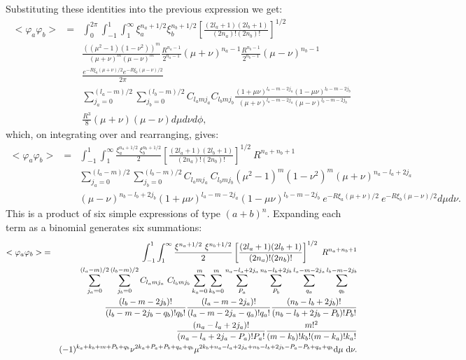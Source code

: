 Substituting these identities into the previous
expression we get:
\begin{eqnarray}
<\varphi _a\varphi _b>& =& \int _0^{2\pi }\int _{-1}^{1} \int _1^{\infty}
\xi_a ^{n_a+1/2}\xi_b^{n_b+1/2}\left [\frac{(2l_a+1)(2l_b+1)}{(2n_a)!(2n_b)!}\right ]
^{1/2} \nonumber \\
&&\frac{((\mu ^2-1)(1-\nu ^2))^m}{(\mu+\nu)^m(\mu-\nu)^m}
\frac{R^{n_a-1}}{2^{n_a-1}}(\mu+\nu)^{n_a-1}\frac{R^{n_b-1}}{2^{n_b-1}}(\mu-\nu)^{n_b-1}\nonumber \\
&&\frac{e^{-R\xi_a(\mu+\nu)/2}e^{-R\xi_b(\mu-\nu)/2}}{2\pi}
 \nonumber \\
&&\sum_{j_a=0}^{(l_a-m)/2}\sum_{j_b=0}^{(l_b-m)/2}
C_{l_amj_a}C_{l_bmj_b}\frac{(1+\mu\nu)^{l_a-m-2j_a}(1-\mu\nu)^{l_b-m-2j_b}}
{(\mu+\nu)^{l_a-m-2j_a}(\mu-\nu)^{l_b-m-2j_b}} \nonumber \\&&
\frac{R^3}{8}(\mu+\nu)(\mu-\nu)d\mu d\nu d\phi , \nonumber
\end{eqnarray}
which, on integrating over and rearranging, gives:
\begin{eqnarray}
<\varphi _a\varphi _b>& =& \int _{-1}^{1} \int _1^{\infty}
\frac{\xi_a ^{n_a+1/2}\ \xi_b^{n_b+1/2}}{2}\left [\frac{(2l_a+1)(2l_b+1)}{(2n_a)!(2n_b)!}\right ]
^{1/2}\ R^{n_a+n_b+1} \nonumber \\
&&\sum_{j_a=0}^{(l_a-m)/2}\sum_{j_b=0}^{(l_b-m)/2}
C_{l_amj_a}\ C_{l_bmj_b}(\mu^2-1)^m(1-\nu^2)^m(\mu+\nu)^{n_a-l_a+2j_a}\nonumber \\&&
(\mu-\nu)^{n_b-l_b+2j_b}(1+\mu\nu)^{l_a-m-2j_a}(1-\mu\nu)^{l_b-m-2j_b}
\ e^{-R\xi_a(\mu+\nu)/2}\ e^{-R\xi_b(\mu-\nu)/2}d\mu d\nu . \nonumber
\end{eqnarray}
This is a product of six simple expressions of type $(a+b)^n$. Expanding each
term as a binomial generates six summations:
\begin{eqnarray}
<\varphi _a\varphi _b>& =& \int _{-1}^{1} \int _1^{\infty}
\frac{\xi ^{n_a+1/2}\ \xi^{n_b+1/2}}{2}\left [\frac{(2l_a+1)(2l_b+1)}{(2n_a)!(2n_b)!}\right ]
^{1/2}\ R^{n_a+n_b+1} \nonumber \\
&&\sum_{j_a=0}^{(l_a-m)/2}\sum_{j_b=0}^{(l_b-m)/2}
C_{l_amj_a}\ C_{l_bmj_b}\sum_{k_a=0}^m\sum_{k_b=0}^m
\sum_{P_a}^{n_a-l_a+2j_a}\sum_{P_b}^{n_b-l_b+2j_b}
\sum_{q_a}^{l_a-m-2j_a}\sum_{q_b}^{l_b-m-2j_b} \nonumber \\ &&
\frac{(l_b-m-2j_b)!}{(l_b-m-2j_b-q_b)!q_b!}
\frac{(l_a-m-2j_a)!}{(l_a-m-2j_a-q_a)!q_a!}
\frac{(n_b-l_b+2j_b)!}{(n_b-l_b+2j_b-P_b)!P_b!} \nonumber \\ &&
\frac{(n_a-l_a+2j_a)!}{(n_a-l_a+2j_a-P_a)!P_a!}
\frac{m!^2}{(m-k_b)!k_b!(m-k_a)!k_a!}  \nonumber \\ &&
(-1)^{k_a+k_b+m+P_b+q_b}
\nu^{2k_a+P_a+P_b+q_a+q_b}
\mu^{2k_b+n_a-l_a+2j_a+n_b-l_b+2j_b-P_a-P_b+q_a+q_b}{\rm d}\mu\ {\rm d}\nu.
  \nonumber
\end{eqnarray}


